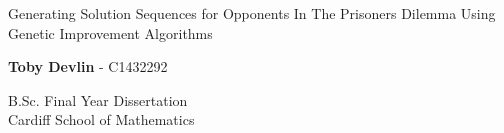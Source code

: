 \begin{titlepage}
    \begin{center}
        \vspace*{5cm}

		Generating Solution Sequences for Opponents In The Prisoners Dilemma Using Genetic Improvement Algorithms 

        \vspace{1.5cm}\textit{}

        \textbf{Toby Devlin} - C1432292
        \vfill

        B.Sc. Final Year Dissertation\\

        \vspace{0.5cm}
        Cardiff School of Mathematics

        \vspace{1.5cm}

    \end{center}
\end{titlepage}